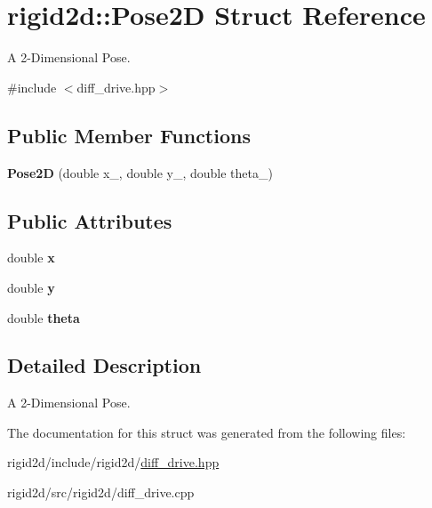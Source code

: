 \hypertarget{structrigid2d_1_1Pose2D}{}\section{rigid2d\+:\+:Pose2D Struct Reference}
\label{structrigid2d_1_1Pose2D}


A 2-\/\+Dimensional Pose.  




{\ttfamily \#include $<$diff\+\_\+drive.\+hpp$>$}

\subsection*{Public Member Functions}
\begin{DoxyCompactItemize}
\item 
\mbox{\label{structrigid2d_1_1Pose2D_a03bb138e7b821c64241b8b6c2f633ec8}} 
{\bfseries Pose2D} (double x\+\_\+, double y\+\_\+, double theta\+\_\+)
\end{DoxyCompactItemize}
\subsection*{Public Attributes}
\begin{DoxyCompactItemize}
\item 
\mbox{\label{structrigid2d_1_1Pose2D_a706d15249c213d0236481ff1bd13c42d}} 
double {\bfseries x}
\item 
\mbox{\label{structrigid2d_1_1Pose2D_a13f985853cc2b924ed87ed37e1857e7f}} 
double {\bfseries y}
\item 
\mbox{\label{structrigid2d_1_1Pose2D_a4c872d777d0f72635b4c0c30c6d423c8}} 
double {\bfseries theta}
\end{DoxyCompactItemize}


\subsection{Detailed Description}
A 2-\/\+Dimensional Pose. 

The documentation for this struct was generated from the following files\+:\begin{DoxyCompactItemize}
\item 
rigid2d/include/rigid2d/\hyperlink{diff__drive_8hpp}{diff\+\_\+drive.\+hpp}\item 
rigid2d/src/rigid2d/diff\+\_\+drive.\+cpp\end{DoxyCompactItemize}
